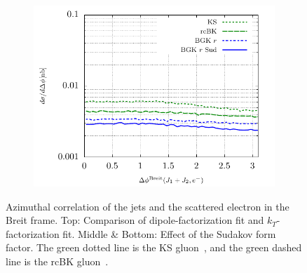 \documentclass[11pt]{article}
\numberwithin{equation}{section}
\numberwithin{table}{section}
\numberwithin{figure}{section}
\begin{document}
\begin{figure}[p]
\begin{subfigure}{0.5\textwidth}
	\end{subfigure}
	\begin{subfigure}{0.5\textwidth}
	\includegraphics[width=\textwidth]{plots/plotBGK3}
	\end{subfigure}
	\caption{\footnotesize Azimuthal correlation of the jets and the scattered electron in the Breit frame. Top: Comparison of dipole-factorization fit and $k_T$-factorization fit. Middle \& Bottom: Effect of the Sudakov form factor. The green dotted line is the KS gluon~\cite{vanHameren:2021sqc}, and the green dashed line is the rcBK gluon~\cite{}.}
	\label{fig:je-breit}
\end{figure}
\end{document}
